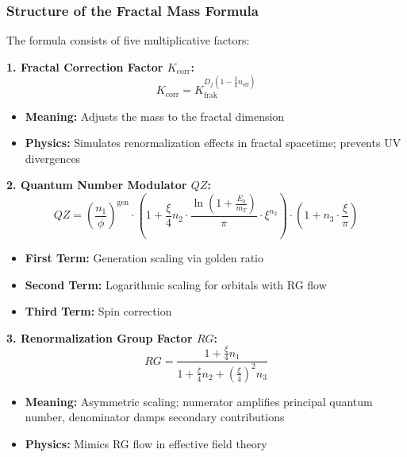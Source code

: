 	\subsubsection{Structure of the Fractal Mass Formula}
	
	The formula consists of five multiplicative factors:
	
	\textbf{1. Fractal Correction Factor $K_{\text{corr}}$:}
	\begin{equation}
		K_{\text{corr}} = K_{\text{frak}}^{D_f \left(1 - \frac{\xi}{4} n_{\text{eff}}\right)}
	\end{equation}
	\begin{itemize}
		\item \textbf{Meaning:} Adjusts the mass to the fractal dimension
		\item \textbf{Physics:} Simulates renormalization effects in fractal spacetime; prevents UV divergences
	\end{itemize}
	
	\textbf{2. Quantum Number Modulator $QZ$:}
	\begin{equation}
		QZ = \left( \frac{n_1}{\phi} \right)^{\text{gen}} \cdot \left(1 + \frac{\xi}{4} n_2 \cdot \frac{\ln\left(1 + \frac{E_0}{m_T}\right)}{\pi} \cdot \xi^{n_2}\right) \cdot \left(1 + n_3 \cdot \frac{\xi}{\pi}\right)
	\end{equation}
	\begin{itemize}
		\item \textbf{First Term:} Generation scaling via golden ratio
		\item \textbf{Second Term:} Logarithmic scaling for orbitals with RG flow
		\item \textbf{Third Term:} Spin correction
	\end{itemize}
	
	\textbf{3. Renormalization Group Factor $RG$:}
	\begin{equation}
		RG = \frac{1 + \frac{\xi}{4} n_1}{1 + \frac{\xi}{4} n_2 + \left(\frac{\xi}{4}\right)^2 n_3}
	\end{equation}
	\begin{itemize}
		\item \textbf{Meaning:} Asymmetric scaling; numerator amplifies principal quantum number, denominator damps secondary contributions
		\item \textbf{Physics:} Mimics RG flow in effective field theory
	\end{itemize}
	
